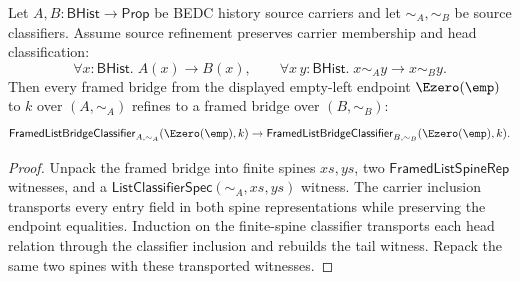 \begin{theorem}
\label{thm:framed-list-bridge-empty-left-source-refinement}
Let $A,B:\mathsf{BHist}\to\mathsf{Prop}$ be BEDC history source carriers and
let $\sim_A,\sim_B$ be source classifiers. Assume source refinement preserves
carrier membership and head classification:
$$
\forall x:\mathsf{BHist}.\; A(x)\to B(x),
\qquad
\forall x\,y:\mathsf{BHist}.\; x\sim_A y\to x\sim_B y.
$$
Then every framed bridge from the displayed empty-left endpoint
$\Ezero(\emp)$ to $k$ over $(A,\sim_A)$ refines to a framed bridge over
$(B,\sim_B)$:
$$
\mathsf{FramedListBridgeClassifier}_{A,\sim_A}(\Ezero(\emp),k)
\to
\mathsf{FramedListBridgeClassifier}_{B,\sim_B}(\Ezero(\emp),k).
$$
\end{theorem}
\begin{proof}
Unpack the framed bridge into finite spines $xs,ys$, two
$\mathsf{FramedListSpineRep}$ witnesses, and a
$\mathsf{ListClassifierSpec}(\sim_A,xs,ys)$ witness. The carrier inclusion
transports every entry field in both spine representations while preserving the
endpoint equalities. Induction on the finite-spine classifier transports each
head relation through the classifier inclusion and rebuilds the tail witness.
Repack the same two spines with these transported witnesses.
\end{proof}

